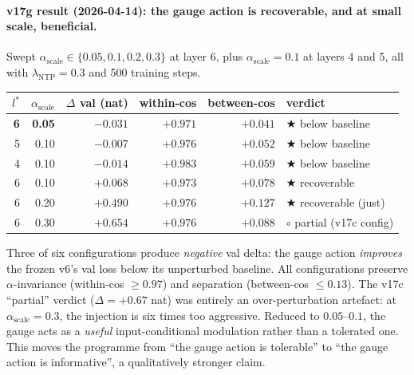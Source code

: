 \documentclass[11pt, a4paper]{article}
\theoremstyle{plain}
\theoremstyle{definition}
\theoremstyle{remark}
\begin{document}
\paragraph{v17g result (2026-04-14): the gauge action is recoverable, and at small scale, beneficial.}
Swept $\alpha_{\mathrm{scale}} \in \{0.05, 0.1, 0.2, 0.3\}$ at layer 6, plus $\alpha_{\mathrm{scale}} = 0.1$ at layers 4 and 5, all with $\lambda_{\mathrm{NTP}} = 0.3$ and 500 training steps.
\begin{center}
\small
\begin{tabular}{rrrrrl}
\toprule
$l^*$ & $\alpha_{\mathrm{scale}}$ & $\Delta$ val (nat) & within-cos & between-cos & verdict \\
\midrule
\textbf{6} & \textbf{0.05} & $\mathbf{-0.031}$ & $+0.971$ & $+0.041$ & $\bigstar$ below baseline \\
5 & 0.10 & $-0.007$ & $+0.976$ & $+0.052$ & $\bigstar$ below baseline \\
4 & 0.10 & $-0.014$ & $+0.983$ & $+0.059$ & $\bigstar$ below baseline \\
6 & 0.10 & $+0.068$ & $+0.973$ & $+0.078$ & $\bigstar$ recoverable \\
6 & 0.20 & $+0.490$ & $+0.976$ & $+0.127$ & $\bigstar$ recoverable (just) \\
6 & 0.30 & $+0.654$ & $+0.976$ & $+0.088$ & $\circ$ partial (v17c config) \\
\bottomrule
\end{tabular}
\end{center}
Three of six configurations produce \emph{negative} val delta: the gauge action \emph{improves} the frozen v6's val loss below its unperturbed baseline.
All configurations preserve $\alpha$-invariance (within-cos $\geq 0.97$) and separation (between-cos $\leq 0.13$).
The v17c ``partial'' verdict ($\Delta = +0.67$ nat) was entirely an over-perturbation artefact: at $\alpha_{\mathrm{scale}}=0.3$, the injection is six times too aggressive.
Reduced to $0.05$--$0.1$, the gauge acts as a \emph{useful} input-conditional modulation rather than a tolerated one.
This moves the programme from ``the gauge action is tolerable'' to ``the gauge action is informative'', a qualitatively stronger claim.
\end{document}
